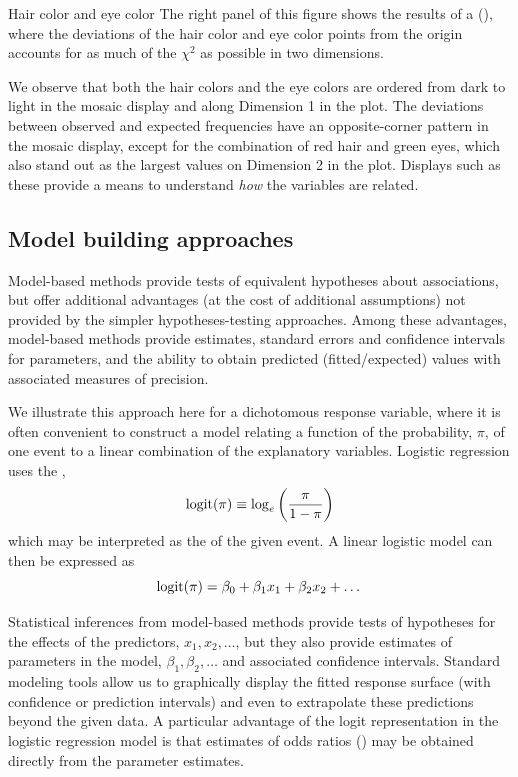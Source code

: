 \documentclass[10pt,krantz2]{krantz}\usepackage[]{graphicx}\usepackage[]{color}
\begin{document}
\begin{Example}[haireye0]{Hair color and eye color}
The right panel of this figure shows the results of
a \ca (), where the deviations of the hair color and eye
color points from the origin accounts for as much of the \(\chi^2\)
as possible in two dimensions.

We observe that both the hair colors and the eye colors
are ordered from dark to light in the mosaic display and along
Dimension 1 in the \ca plot.  The deviations between observed
and expected frequencies have an opposite-corner pattern in the
mosaic display, except for the combination of red hair and green
eyes, which also stand out as the largest values on Dimension 2
in the \CA plot.
Displays such as these provide a means to understand \emph{how}
the variables are related.
\end{Example}

\subsection{Model building approaches}
Model-based methods provide tests of equivalent
hypotheses about associations, but
offer additional advantages (at the cost of additional assumptions)
not provided by the simpler hypotheses-testing approaches.
Among these advantages, model-based methods provide estimates,
standard errors and confidence intervals for parameters, and the
ability to obtain predicted (fitted/expected) values with associated measures
of precision.

We illustrate this approach here for a dichotomous response variable,
where it is often convenient to
construct a model relating a function of the probability, $\pi$,
of one event to a linear combination of the explanatory variables.
Logistic regression uses the ,
\begin{equation*}
 \logit ( \pi ) \equiv \log_e \left( \frac { \pi } {1 - \pi} \right)
\end{equation*}
which may be interpreted as the  of the given event.
A linear logistic model
can then be expressed as
\begin{equation*}
 \logit ( \pi ) = \beta_0 + \beta_1 x_1 + \beta_2 x_2 + \dots
\end{equation*}

Statistical inferences from model-based methods provide tests of
hypotheses for the effects of the predictors, $x_1, x_2, \dots$,
but they also provide estimates of parameters in the model,
$\beta_1, \beta_2, \dots$ and associated confidence intervals.
Standard modeling tools allow us to graphically display the
fitted response surface (with confidence or prediction intervals)
and even to extrapolate these predictions beyond the given data.
A particular advantage of the logit representation
in the logistic regression model is that estimates of odds ratios
()
may be obtained directly from the parameter estimates.
\end{document}
